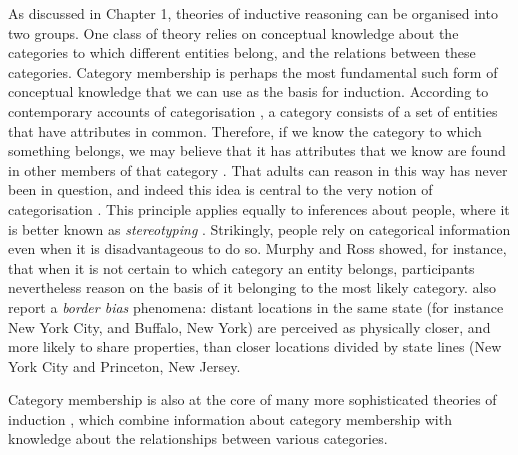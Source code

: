 As discussed in Chapter 1,
theories of inductive reasoning can be organised into two groups.
One class of theory relies on conceptual knowledge
about the categories to which different entities belong,
and the relations between these categories.
Category membership is perhaps the most fundamental 
such form of conceptual knowledge that we can use as the basis for induction.
According to contemporary accounts of categorisation
\citep[see][]{Murphy2004,Rosch1988},
a category consists of a set of entities that have attributes in common.
Therefore, if we know the category to which something belongs,
we may believe that it has attributes
that we know are found in other members of that category
\citep{Murphy2004,Osherson1990}.
That adults can reason in this way has never been in question,
and indeed this idea is central to the very notion of categorisation
\citep{Mill1856,Gelman1986}.
This principle applies equally to inferences about people,
where it is better known as \emph{stereotyping}
\citep{Greenwald1995,Oakes1994}.
Strikingly, people rely on categorical information
even when it is disadvantageous to do so.
Murphy and Ross \citep{Murphy2012,Murphy2010,Malt1995,Murphy1994}
showed, for instance, that when it is not certain
to which category an entity belongs,
participants nevertheless reason on the basis
of it belonging to the most likely category.
\citet{Mishra2010} also report a \emph{border bias} phenomena:
distant locations in the same state (for instance New York City, and Buffalo, New York) 
are perceived as physically closer, and more likely to share properties,
than closer locations divided by state lines (New York City and Princeton, New Jersey.

Category membership is also at the core of many more sophisticated theories of induction
\citep[i.e.][]{Osherson1990,Griffiths2009,Kemp2009},
which combine information about category membership
with knowledge about the relationships between various categories.

